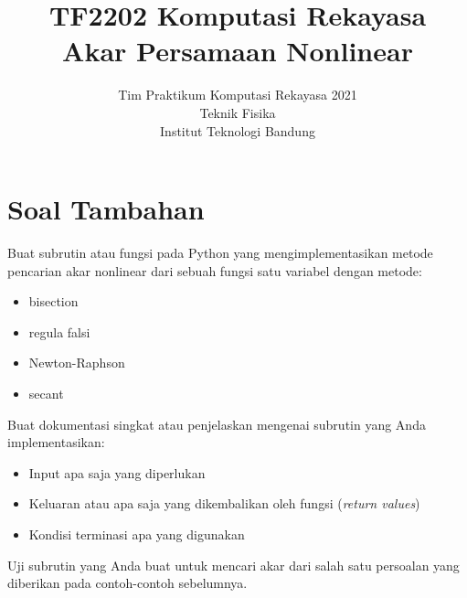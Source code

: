 



\title{%
{\small TF2202 Komputasi Rekayasa}\\
Akar Persamaan Nonlinear
}
\author{Tim Praktikum Komputasi Rekayasa 2021\\
Teknik Fisika\\
Institut Teknologi Bandung}
\date{}
\maketitle













\section{Soal Tambahan}

\begin{soal}
Buat subrutin atau fungsi pada Python yang mengimplementasikan metode pencarian akar nonlinear
dari sebuah fungsi satu variabel dengan metode:
\begin{itemize}
\item bisection
\item regula falsi
\item Newton-Raphson
\item secant
\end{itemize}
Buat dokumentasi singkat atau penjelaskan mengenai subrutin yang Anda implementasikan:
\begin{itemize}
\item Input apa saja yang diperlukan
\item Keluaran atau apa saja yang dikembalikan oleh fungsi (\textit{return values})
\item Kondisi terminasi apa yang digunakan
\end{itemize}
Uji subrutin yang Anda buat untuk mencari akar dari salah satu persoalan yang
diberikan pada contoh-contoh sebelumnya.
\end{soal}
















